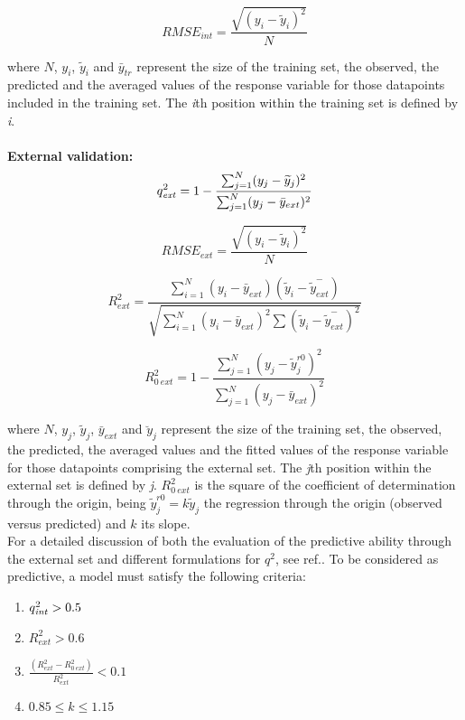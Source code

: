 \documentclass[twoside,a4wide,12pt]{article}\usepackage[]{graphicx}\usepackage[]{color}
\begin{document}
\begin{equation}
RMSE_{int} = \frac {\sqrt {(y_i - \widetilde{y}_i)^{2}}} {N}
\end{equation}

where $N$, $y_i$, $\widetilde{y}_i$ and $\bar{y}_{tr}$ represent the size of the training set, the observed, the predicted and the averaged values of the response variable for those datapoints included in the training set. The {\it i}th position within the training set is defined by {\it i}.  
\\
\\
{\bf External validation:}
\\

\begin{equation}
q_{{\it ext}}^{2} = 1 - \frac {\sum_{j=1}^{N} (y_j-\widetilde{y}_j)^{2}}  {\sum_{j=1}^{N} (y_j - \bar{y}_{ext})^{2}}
\end{equation}

\begin{equation}
RMSE_{ext} = \frac {\sqrt {(y_i - \widetilde{y}_i)^{2}}} {N} 
\end{equation}

\begin{equation}
R_{ext}^{2} = \frac {{\sum_{i=1}^{N} (y_{i} - \bar{y}_{ext})}  (\widetilde{y}_{i} - \overset{-}{\widetilde{y}_{ext}})} 
{\sqrt{\sum_{i=1}^{N} (y_{i} - \bar{y}_{ext})^{2} \sum{ (\widetilde{y}_{i} - \overset{-}{\widetilde{y}_{ext}})^{2}}}}
\end{equation}

\begin{equation}
R_{0\:ext}^2 = 1 - \frac {\sum_{j=1}^{N} (y_{j} - \widetilde{y}_{j}^{ r0})^{2}} {\sum_{j=1}^{N} (y_{j} - \bar{y}_{ext})^{2}} 
\end{equation}

where $N$, $y_j$, $\widetilde{y}_j$, $\bar{y}_{ext}$ and $\breve{y}_j$ represent the size of the training set, the observed, the predicted, the averaged values and the fitted
values of the response variable for those datapoints comprising the external set. The {\it j}th position within the external set is defined by {\it j}. $R_{0\:ext}^2$ is the square of the coefficient of determination through the origin, being $\widetilde{y}_{j}^{ r0} = k \widetilde{y}_j$ the regression through the origin (observed versus predicted) and $k$ its slope.\\
For a detailed discussion of both the evaluation of the predictive ability through the external set and different formulations for $q^{2}$, see ref.\cite{consonni}. 
To be considered as predictive, a model must satisfy the following criteria:\cite{beware,earnest}
\\
\begin{enumerate}
\item $q_{{\it int}}^{2} > 0.5$
\item $R_{ext}^2 > 0.6$
\item $ \frac {(R_{ext}^2 - R_{0\:ext}^2)} {R_{ext}^2} < 0.1$
\item $0.85 \leq k \leq 1.15$
\end{enumerate}
\end{document}

